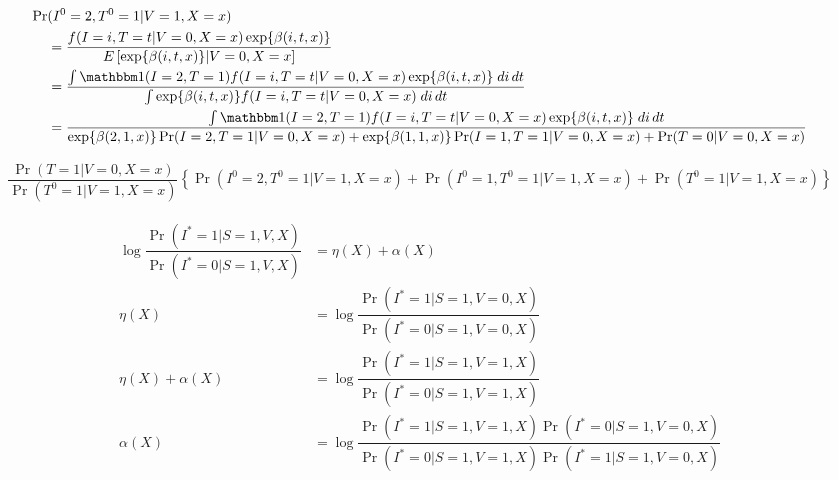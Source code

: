 \begin{appendix}
\begin{align*}
    \Pr&(I^0 = 2, T^0 = 1 | V = 1, X = x) \\
    &= \dfrac{f(I = i, T = t  | V = 0, X = x) \exp\{\beta(i, t, x)\}}{E\left[ \exp\{\beta(i, t, x)\} | V = 0, X = x\right]} \\
    &=\dfrac{\int \mathbbm 1 (I = 2, T = 1) f(I = i, T = t  | V = 0, X = x) \exp\{\beta(i, t, x)\}\;di\,dt}{\int \exp\{\beta(i, t, x)\} f(I = i, T = t | V = 0, X = x) \;di\,dt} \\
    &=\dfrac{\int \mathbbm 1 (I = 2, T = 1) f(I = i, T = t  | V = 0, X = x) \exp\{\beta(i, t, x)\}\;di\,dt}{\exp\{\beta(2, 1, x)\} \Pr(I = 2, T = 1 | V = 0, X = x) + \exp\{\beta(1, 1, x)\} \Pr(I = 1, T = 1 | V = 0, X = x) + \Pr(T= 0| V = 0, X = x) }
\end{align*}

\begin{align*}
    \dfrac{\Pr(T = 1 | V = 0, X = x)}{\Pr(T^0 = 1 | V = 1, X = x)} \left\{ \Pr(I^0 = 2, T^0 = 1 | V = 1, X = x) + \Pr(I^0 = 1, T^0 = 1 | V = 1, X = x) + \Pr(T^0 = 1 | V = 1, X = x)\right \}
\end{align*}


\begin{align*}
    \log \dfrac{\Pr(I^* = 1 | S = 1, V, X)}{\Pr(I^* = 0 | S = 1, V, X)} &= \eta(X) + \alpha (X) \\
    \eta(X) &= \log \dfrac{\Pr(I^* = 1 | S = 1, V=0, X)}{\Pr(I^* = 0 | S = 1, V=0, X)} \\
    \eta(X) + \alpha(X) &= \log \dfrac{\Pr(I^* = 1 | S = 1, V=1, X)}{\Pr(I^* = 0 | S = 1, V=1, X)} \\
    \alpha(X) &= \log \dfrac{\Pr(I^* = 1 | S = 1, V=1, X)\Pr(I^* = 0 | S = 1, V=0, X)}{\Pr(I^* = 0 | S = 1, V=1, X)\Pr(I^* = 1 | S = 1, V=0, X)} \\
\end{align*}


\end{appendix}
